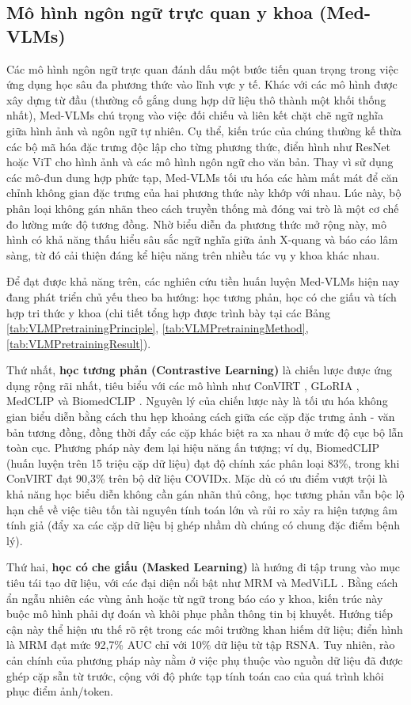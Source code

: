 \subsection{Mô hình ngôn ngữ trực quan y khoa (Med-VLMs)} Các mô hình ngôn ngữ trực quan đánh dấu một bước tiến quan trọng
trong việc ứng dụng học sâu đa phương thức vào lĩnh vực y tế. Khác với các mô hình được xây dựng từ đầu (thường cố gắng dung hợp dữ liệu thô thành một khối thống nhất), Med-VLMs chú trọng vào việc đối chiếu và liên kết chặt chẽ ngữ nghĩa giữa hình ảnh và ngôn ngữ tự nhiên. Cụ thể, kiến trúc của chúng thường kế thừa các bộ mã hóa đặc trưng độc lập cho từng phương thức, điển hình như ResNet hoặc ViT cho hình ảnh và các mô hình ngôn ngữ cho văn bản. Thay vì sử dụng các mô-đun dung hợp phức tạp, Med-VLMs tối ưu hóa các hàm mất mát để căn chỉnh không gian đặc trưng của hai phương thức này khớp với nhau. Lúc này, bộ phân loại không gán nhãn theo cách truyền thống mà đóng vai trò là một cơ chế đo lường mức độ tương đồng. Nhờ biểu diễn đa phương thức mở rộng này, mô hình có khả năng thấu hiểu sâu sắc ngữ nghĩa giữa ảnh X-quang và báo cáo lâm sàng, từ đó cải thiện đáng kể hiệu năng trên nhiều tác vụ y khoa khác nhau.

Để đạt được khả năng trên, các nghiên cứu tiền huấn luyện Med-VLMs hiện nay đang phát triển chủ yếu theo ba hướng: học tương phản, học có che giấu và tích hợp tri thức y khoa (chi tiết tổng hợp được trình bày tại các Bảng \ref{tab:VLMPretrainingPrinciple}, \ref{tab:VLMPretrainingMethod}, \ref{tab:VLMPretrainingResult}).

Thứ nhất, \textbf{học tương phản (Contrastive Learning)} là chiến lược được ứng dụng rộng rãi nhất, tiêu biểu với các mô hình như ConVIRT \cite{ConVIRT}, GLoRIA \cite{GLoRIA}, MedCLIP \cite{MedCLIP} và BiomedCLIP \cite{BiomedCLIP}. Nguyên lý của chiến lược này là tối ưu hóa không gian biểu diễn bằng cách thu hẹp khoảng cách giữa các cặp đặc trưng ảnh - văn bản tương đồng, đồng thời đẩy các cặp khác biệt ra xa nhau ở mức độ cục bộ lẫn toàn cục. Phương pháp này đem lại hiệu năng ấn tượng; ví dụ, BiomedCLIP \cite{BiomedCLIP} (huấn luyện trên 15 triệu cặp dữ liệu) đạt độ chính xác phân loại 83\%, trong khi ConVIRT \cite{ConVIRT} đạt 90,3\% trên bộ dữ liệu COVIDx. Mặc dù có ưu điểm vượt trội là khả năng học biểu diễn không cần gán nhãn thủ công, học tương phản vẫn bộc lộ hạn chế về việc tiêu tốn tài nguyên tính toán lớn và rủi ro xảy ra hiện tượng âm tính giả (đẩy xa các cặp dữ liệu bị ghép nhầm dù chúng có chung đặc điểm bệnh lý).

Thứ hai, \textbf{học có che giấu (Masked Learning)} là hướng đi tập trung vào mục tiêu tái tạo dữ liệu, với các đại diện nổi bật như MRM \cite{MRM} và MedViLL \cite{MedViLL}. Bằng cách ẩn ngẫu nhiên các vùng ảnh hoặc từ ngữ trong báo cáo y khoa, kiến trúc này buộc mô hình phải dự đoán và khôi phục phần thông tin bị khuyết. Hướng tiếp cận này thể hiện ưu thế rõ rệt trong các môi trường khan hiếm dữ liệu; điển hình là MRM \cite{MRM} đạt mức 92,7\% AUC chỉ với 10\% dữ liệu từ tập RSNA. Tuy nhiên, rào cản chính của phương pháp này nằm ở việc phụ thuộc vào nguồn dữ liệu đã được ghép cặp sẵn từ trước, cộng với độ phức tạp tính toán cao của quá trình khôi phục điểm ảnh/token.

